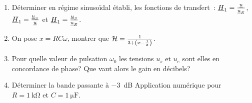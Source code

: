 \begin{exercice}%
	\begin{enumerate}
		\item Déterminer en régime sinusoïdal établi, les fonctions de transfert~: 
			\(\underline{H}_1 = \frac{\underline{u}}{\underline{u}_E}\), \(\underline{H}_1 = \frac{\underline{u}_S}{\underline{u}}\) et \(\underline{H}_1 = 
			\frac{\underline{u}_S}{\underline{u}_E}\).
		\item On pose \(x = R C \omega\), montrer que \(\mathcal{H} = 
			\frac{1}{3+\left(x-\frac{1}{x} \right)}\).
		\item Pour quelle valeur de pulsation \(\omega_0\) les tensions \(u_s\) et 
			\(u_e\) sont elles en concordance de phase? Que vaut alors le gain en 
			décibels?
		\item Déterminer la bande passante à \SI{-3}{\dB} Application numérique 
			pour \(R = \SI{1}{\kilo\ohm}\) et \(C = \SI{1}{\micro\farad}\).
	\end{enumerate}
\end{exercice}%
